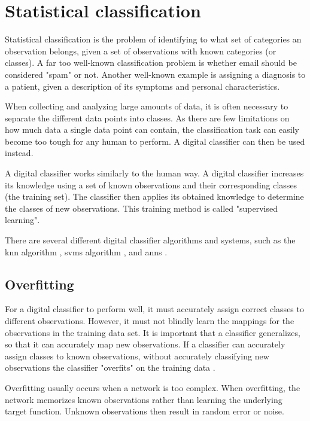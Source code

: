 \section{Statistical classification}

Statistical classification is the problem of identifying to what set of categories an observation belongs, given a set of observations with known categories (or classes). A far too well-known classification problem is whether email should be considered "spam" or not. Another well-known example is assigning a diagnosis to a patient, given a description of its symptoms and personal characteristics.

When collecting and analyzing large amounts of data, it is often necessary to separate the different data points into classes. As there are few limitations on how much data a single data point can contain, the classification task can easily become too tough for any human to perform. A digital classifier can then be used instead.

A digital classifier works similarly to the human way. A digital classifier increases its knowledge using a set of known observations and their corresponding classes (the training set). The classifier then applies its obtained knowledge to determine the classes of new observations. This training method is called "supervised learning".

There are several different digital classifier algorithms and systems, such as the \gls{knn} algorithm \citep{bib:peterson-2009}, \glspl{svm} algorithm \citep{bib:noble-2006}, and \glspl{ann} \citep{bib:yegnanarayana-2009}.


\subsection{Overfitting}

For a digital classifier to perform well, it must accurately assign correct classes to different observations. However, it must not blindly learn the mappings for the observations in the training data set. It is important that a classifier generalizes, so that it can accurately map new observations. If a classifier can accurately assign classes to known observations, without accurately classifying new observations the classifier "overfits" on the training data \citep{bib:hawkins2004problem}.

Overfitting usually occurs when a network is too complex. When overfitting, the network memorizes known observations rather than learning the underlying target function. Unknown observations then result in random error or noise.